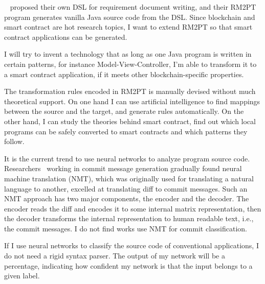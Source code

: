 ~\cite{yang2019automated} proposed their own DSL for requirement document writing,  and their RM2PT program generates vanilla Java source code from the DSL. Since blockchain and smart contract are hot research topics, I want to extend RM2PT so that smart contract applications can be generated.


I will try to invent a technology that as long as one Java program is written in certain patterns, for instance Model-View-Controller, I'm able to transform it to a smart contract application, if it meets other blockchain-specific properties.

The transformation rules encoded in RM2PT is manually devised without much theoretical support. On one hand I can use artificial intelligence to find mappings between the source and the target, and generate rules automatically. On the other hand, I can study the theories behind smart contract, find out which local programs can be safely converted to smart contracts and which patterns they follow.



It is the current trend to use neural networks to analyze program source code.
Researchers~\cite{xu2019commit,liu2019generating} working in commit message generation gradually found neural machine translation (NMT),
which was originally used for translating a natural language to another,
excelled at translating diff to commit messages.
Such an NMT approach has two major components, the encoder and the decoder.
The encoder reads the diff and encodes it to some internal matrix representation,
then the decoder transforms the internal representation to human readable text, i.e., the commit messages.
I do not find works use NMT for commit classification.


If I use neural networks to classify the source code of conventional applications, I do not need a rigid syntax parser.
The output of my network will be a percentage, indicating how confident my network is that the input belongs to a given label.



%
%

